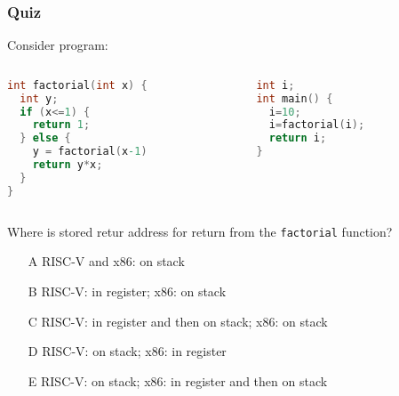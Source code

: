 \documentclass{beamer}
\begin{document}
\begin{frame}[fragile,shrink=10]
\frametitle{Quiz}

Consider program:
\begin{columns}
\begin{column}{0.45\textwidth}
\begin{lstlisting}[language={C},columns=flexible]
int factorial(int x) {
  int y;
  if (x<=1) {
    return 1;
  } else {
    y = factorial(x-1)
    return y*x;
  }
}
\end{lstlisting}
\end{column}
\hfill
\begin{column}{0.45\textwidth}  
\begin{lstlisting}[language={C},columns=flexible]
int i;
int main() {
  i=10;
  i=factorial(i);
  return i;
}
\end{lstlisting}
\end{column}
\end{columns}

Where is stored retur address for return from the \texttt{factorial} function?
\begin{itemize}
\item[A] RISC-V and x86: on stack
\item[B] RISC-V: in register; x86: on stack
\item[C] RISC-V: in register and then on stack; x86: on stack
\item[D] RISC-V: on stack; x86: in register
\item[E] RISC-V: on stack; x86: in register and then on stack
\end{itemize}
\end{frame}
\end{document}
